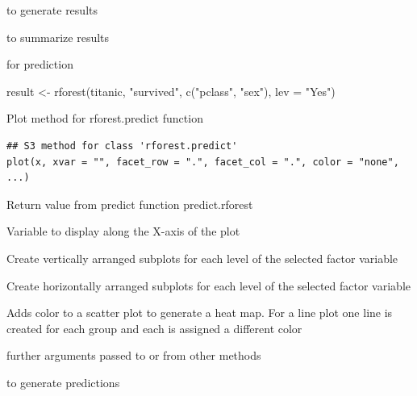 \documentclass[a4paper]{book}
\begin{document}
%
\begin{SeeAlso}
 to generate results

 to summarize results

 for prediction
\end{SeeAlso}
%
\begin{Examples}
\begin{ExampleCode}
result <- rforest(titanic, "survived", c("pclass", "sex"), lev = "Yes")

\end{ExampleCode}
\end{Examples}
%
\begin{Description}
Plot method for rforest.predict function
\end{Description}
%
\begin{Usage}
\begin{verbatim}
## S3 method for class 'rforest.predict'
plot(x, xvar = "", facet_row = ".", facet_col = ".", color = "none", ...)
\end{verbatim}
\end{Usage}
%
\begin{Arguments}
\begin{ldescription}
\item[\code{x}] Return value from predict function predict.rforest

\item[\code{xvar}] Variable to display along the X-axis of the plot

\item[\code{facet\_row}] Create vertically arranged subplots for each level of the selected factor variable

\item[\code{facet\_col}] Create horizontally arranged subplots for each level of the selected factor variable

\item[\code{color}] Adds color to a scatter plot to generate a heat map. For a line plot one line is created for each group and each is assigned a different color

\item[\code{...}] further arguments passed to or from other methods
\end{ldescription}
\end{Arguments}
%
\begin{SeeAlso}
 to generate predictions
\end{SeeAlso}
\end{document}
